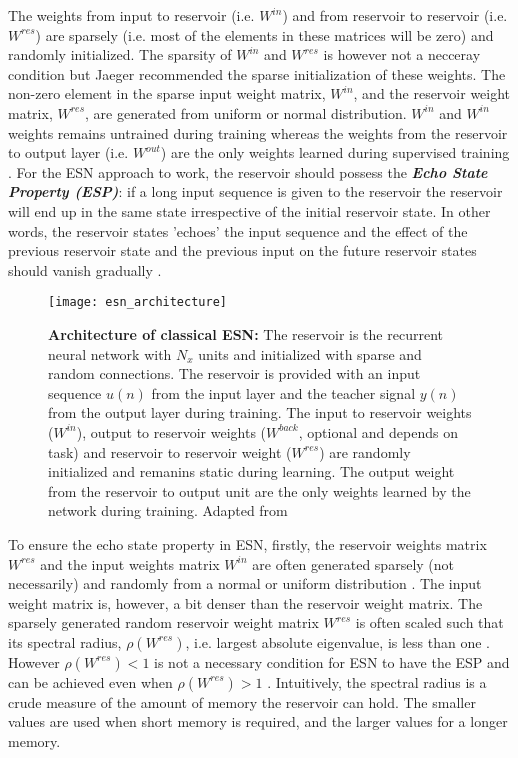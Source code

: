 The weights from input to reservoir (i.e. $W^{in}$) and from reservoir to reservoir (i.e. $W^{res}$) are sparsely (i.e. most of the elements in these matrices will be zero) and randomly initialized. The sparsity of $W^{in}$ and $W^{res}$ is however not a necceray condition but Jaeger \cite{esn:jaeger:2001} recommended the sparse initialization of these weights. The non-zero element in the sparse input weight matrix, $W^{in}$, and the reservoir weight matrix, $W^{res}$, are generated from uniform or normal distribution. $W^{in}$  and $W^{in}$ weights remains untrained during training whereas the weights from the reservoir to output layer (i.e. $W^{out}$) are the only weights learned during supervised training \cite{esn:jaeger:2001, esn:practical_guide}. For the ESN approach to work, the reservoir should possess the \textit{\textbf{Echo State Property (ESP)}}: if a long input sequence is given to the reservoir the reservoir will end up in the same state irrespective of the initial reservoir state. In other words, the reservoir states 'echoes' the input sequence and the effect of the previous reservoir state and the previous input on the future reservoir states should vanish gradually \cite{esn:practical_guide, esn:jaeger_tutorial}. 

\begin{figure}[hbtp]
\centering
\texttt{[image: esn\_architecture]}
\caption[Architecture of classical ESN]{\textbf{Architecture of classical ESN:} The reservoir is the recurrent neural network with $N_{x}$ units and initialized with sparse and random connections. The reservoir is provided with an input sequence $u(n)$ from the input layer and the teacher signal $y(n)$ from the output layer during training. The input to reservoir weights ($W^{in}$), output to reservoir weights ($W^{back}$, optional and depends on task) and reservoir to reservoir weight ($W^{res}$) are randomly initialized and remanins static during learning. The output weight from the reservoir to output unit are the only weights learned by the network during training. Adapted from \cite{esn:practical_guide}}
\label{fig:esn_arch}
\end{figure}

To ensure the echo state property in ESN, firstly, the reservoir weights matrix $W^{res}$ and the input weights matrix $W^{in}$ are often generated sparsely (not necessarily) and randomly from a normal or uniform distribution \cite{esn:practical_guide}. The input weight matrix is, however, a bit denser than the reservoir weight matrix. The sparsely generated random reservoir weight matrix $W^{res}$ is often scaled such that its spectral radius, $\rho(W^{res})$, i.e. largest absolute eigenvalue, is less than one \cite{esn:scholarpedia:2007}. However $\rho(W^{res}) < 1 $ is not a necessary condition for ESN to have the ESP and can be achieved even when $\rho(W^{res}) > 1$ \cite{esn:jaeger:2001, esn:practical_guide, esn:jaeger_tutorial}. Intuitively, the spectral radius is a crude measure of the amount of memory the reservoir can hold. The smaller values are used when short memory is required, and the larger values for a longer memory\cite{esn:practical_guide}.

